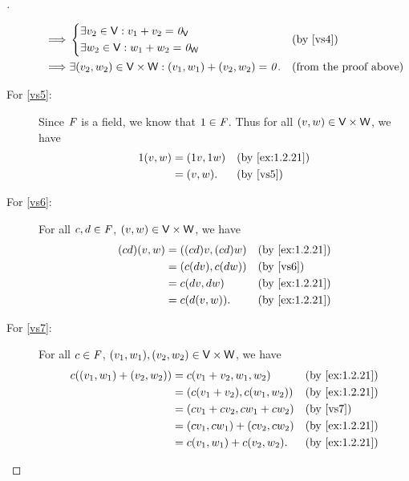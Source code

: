 \begin{proof}[]
\begin{description}
\begin{align*}
				\implies & \begin{dcases}
					           \exists v_2 \in \mathsf{V} : v_1 + v_2 = \mathit{0}_{\mathsf{V}} \\
					           \exists w_2 \in \mathsf{V} : w_1 + w_2 = \mathit{0}_{\mathsf{W}}
				           \end{dcases}                         &  & \text{(by \ref{vs4})}                                         \\
				\implies & \exists (v_2, w_2) \in \mathsf{V} \times \mathsf{W} : (v_1, w_1) + (v_2, w_2) = \mathit{0}. &  & \text{(from the proof above)}
			\end{align*}
		\item[For \ref{vs5}:]
			Since \(\mathit{F}\) is a field, we know that \(1 \in \mathit{F}\).
			Thus for all \((v, w) \in \mathsf{V} \times \mathsf{W}\), we have
			\begin{align*}
				1(v, w) & = (1v, 1w) &  & \text{(by \cref{ex:1.2.21})} \\
				        & = (v, w).  &  & \text{(by \ref{vs5})}
			\end{align*}
		\item[For \ref{vs6}:]
			For all \(c, d \in \mathit{F}\), \((v, w) \in \mathsf{V} \times \mathsf{W}\), we have
			\begin{align*}
				(cd) (v, w) & = ((cd) v, (cd) w) &  & \text{(by \cref{ex:1.2.21})} \\
				            & = (c(dv), c(dw))   &  & \text{(by \ref{vs6})}        \\
				            & = c (dv, dw)       &  & \text{(by \cref{ex:1.2.21})} \\
				            & = c(d(v, w)).      &  & \text{(by \cref{ex:1.2.21})}
			\end{align*}
		\item[For \ref{vs7}:]
			For all \(c \in \mathit{F}\), \((v_1, w_1), (v_2, w_2) \in \mathsf{V} \times \mathsf{W}\), we have
			\begin{align*}
				c ((v_1, w_1) + (v_2, w_2)) & = c (v_1 + v_2, w_1, w_2)     &  & \text{(by \cref{ex:1.2.21})} \\
				                            & = (c(v_1 + v_2), c(w_1, w_2)) &  & \text{(by \cref{ex:1.2.21})} \\
				                            & = (cv_1 + cv_2, cw_1 + cw_2)  &  & \text{(by \ref{vs7})}        \\
				                            & = (cv_1, cw_1) + (cv_2, cw_2) &  & \text{(by \cref{ex:1.2.21})} \\
				                            & = c(v_1, w_1) + c(v_2, w_2).  &  & \text{(by \cref{ex:1.2.21})}
			\end{align*}

\end{description}
\end{proof}
